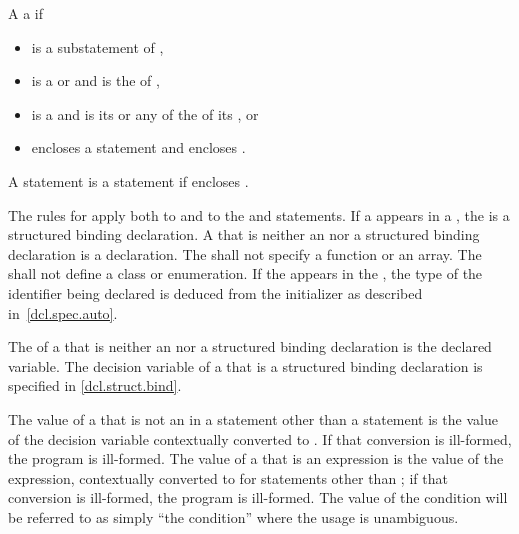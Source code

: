 \pnum
{}%
A   
a   if
\begin{itemize}
\item
   is a substatement of ,
\item
   is a  or
   and
   is the  of ,
\item
   is a  and 
  is its  or
  any of the  of
  its , or
\item
   encloses a statement  and  encloses .
\end{itemize}
%
A statement  is
a statement  if
 encloses .

\pnum
{}%
The rules for  apply both
to  and
to the  and  statements.
If a 
appears in a ,
the  is a structured binding declaration.
A  that is
neither an  nor a structured binding declaration
is a declaration.
The  shall not
specify a function or an array. The  shall not
define a class or enumeration. If the   appears in
the ,
the type of the identifier being declared is deduced from the initializer as described in~\ref{dcl.spec.auto}.

\pnum
The  of a 
that is neither an  nor a structured binding declaration
is the declared variable.
The decision variable of a 
that is a structured binding declaration is specified in \ref{dcl.struct.bind}.

\pnum
The value of a  that is not an 
in a statement other than a  statement is the value of the
decision variable
contextually converted to .
If that
conversion is ill-formed, the program is ill-formed.
The value of a
 that is an expression is the value of the
expression, contextually converted to 
for statements other
than ;
if that conversion is ill-formed, the program is
ill-formed. The value of the condition will be referred to as simply
``the condition'' where the usage is unambiguous.

